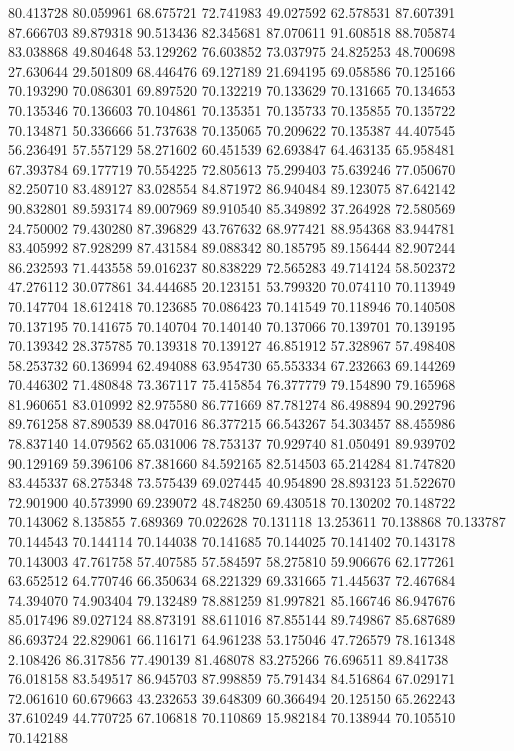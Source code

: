 80.413728
80.059961
68.675721
72.741983
49.027592
62.578531
87.607391
87.666703
89.879318
90.513436
82.345681
87.070611
91.608518
88.705874
83.038868
49.804648
53.129262
76.603852
73.037975
24.825253
48.700698
27.630644
29.501809
68.446476
69.127189
21.694195
69.058586
70.125166
70.193290
70.086301
69.897520
70.132219
70.133629
70.131665
70.134653
70.135346
70.136603
70.104861
70.135351
70.135733
70.135855
70.135722
70.134871
50.336666
51.737638
70.135065
70.209622
70.135387
44.407545
56.236491
57.557129
58.271602
60.451539
62.693847
64.463135
65.958481
67.393784
69.177719
70.554225
72.805613
75.299403
75.639246
77.050670
82.250710
83.489127
83.028554
84.871972
86.940484
89.123075
87.642142
90.832801
89.593174
89.007969
89.910540
85.349892
37.264928
72.580569
24.750002
79.430280
87.396829
43.767632
68.977421
88.954368
83.944781
83.405992
87.928299
87.431584
89.088342
80.185795
89.156444
82.907244
86.232593
71.443558
59.016237
80.838229
72.565283
49.714124
58.502372
47.276112
30.077861
34.444685
20.123151
53.799320
70.074110
70.113949
70.147704
18.612418
70.123685
70.086423
70.141549
70.118946
70.140508
70.137195
70.141675
70.140704
70.140140
70.137066
70.139701
70.139195
70.139342
28.375785
70.139318
70.139127
46.851912
57.328967
57.498408
58.253732
60.136994
62.494088
63.954730
65.553334
67.232663
69.144269
70.446302
71.480848
73.367117
75.415854
76.377779
79.154890
79.165968
81.960651
83.010992
82.975580
86.771669
87.781274
86.498894
90.292796
89.761258
87.890539
88.047016
86.377215
66.543267
54.303457
88.455986
78.837140
14.079562
65.031006
78.753137
70.929740
81.050491
89.939702
90.129169
59.396106
87.381660
84.592165
82.514503
65.214284
81.747820
83.445337
68.275348
73.575439
69.027445
40.954890
28.893123
51.522670
72.901900
40.573990
69.239072
48.748250
69.430518
70.130202
70.148722
70.143062
8.135855
7.689369
70.022628
70.131118
13.253611
70.138868
70.133787
70.144543
70.144114
70.144038
70.141685
70.144025
70.141402
70.143178
70.143003
47.761758
57.407585
57.584597
58.275810
59.906676
62.177261
63.652512
64.770746
66.350634
68.221329
69.331665
71.445637
72.467684
74.394070
74.903404
79.132489
78.881259
81.997821
85.166746
86.947676
85.017496
89.027124
88.873191
88.611016
87.855144
89.749867
85.687689
86.693724
22.829061
66.116171
64.961238
53.175046
47.726579
78.161348
2.108426
86.317856
77.490139
81.468078
83.275266
76.696511
89.841738
76.018158
83.549517
86.945703
87.998859
75.791434
84.516864
67.029171
72.061610
60.679663
43.232653
39.648309
60.366494
20.125150
65.262243
37.610249
44.770725
67.106818
70.110869
15.982184
70.138944
70.105510
70.142188
